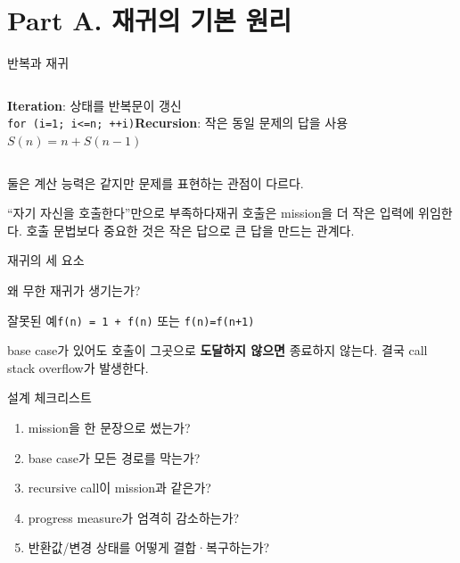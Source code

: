 \section{Part A. 재귀의 기본 원리}
\begin{frame}{반복과 재귀}\begin{columns}[T]\textbf{Iteration}: 상태를 반복문이 갱신\\[2mm]\texttt{for (i=1; i<=n; ++i)}\textbf{Recursion}: 작은 동일 문제의 답을 사용\\[2mm]$S(n)=n+S(n-1)$\end{columns}\vfill 둘은 계산 능력은 같지만 문제를 표현하는 관점이 다르다.
\end{frame}
\begin{frame}{“자기 자신을 호출한다”만으로 부족하다}\vspace{1mm}재귀 호출은 mission을 더 작은 입력에 위임한다. 호출 문법보다 중요한 것은 \alert{작은 답으로 큰 답을 만드는 관계}다.
\end{frame}
\begin{frame}{재귀의 세 요소}
\end{frame}
\begin{frame}{왜 무한 재귀가 생기는가?}\begin{alertblock}{잘못된 예}\texttt{f(n) = 1 + f(n)} 또는 \texttt{f(n)=f(n+1)}\end{alertblock}base case가 있어도 호출이 그곳으로 \textbf{도달하지 않으면} 종료하지 않는다. 결국 call stack overflow가 발생한다.
\end{frame}
\begin{frame}{설계 체크리스트}\begin{enumerate}\item mission을 한 문장으로 썼는가?\item base case가 모든 경로를 막는가?\item recursive call이 mission과 같은가?\item progress measure가 엄격히 감소하는가?\item 반환값/변경 상태를 어떻게 결합·복구하는가?\end{enumerate}
\vfill{}
\end{frame}
